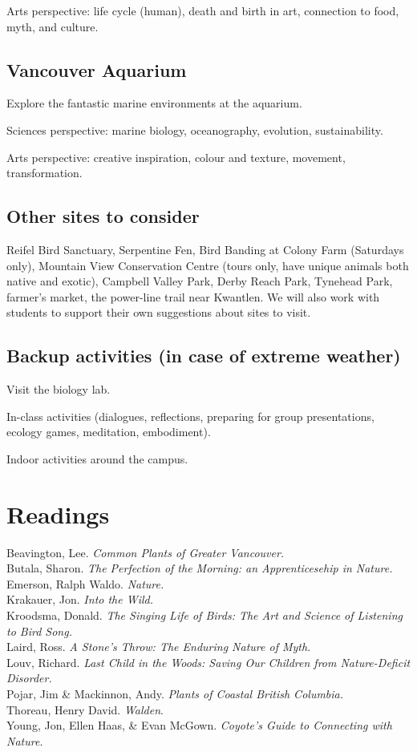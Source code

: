 \documentclass[12pt, letterpaper]{article}
\begin{document}
Arts perspective: life cycle (human), death and birth in art, connection to food, myth, and culture.

\subsection{Vancouver Aquarium}

Explore the fantastic marine environments at the aquarium.

Sciences perspective: marine biology, oceanography, evolution, sustainability.

Arts perspective: creative inspiration, colour and texture, movement, transformation.

\subsection{Other sites to consider}

Reifel Bird Sanctuary, Serpentine Fen, Bird
Banding at Colony Farm (Saturdays only), Mountain View Conservation
Centre (tours only, have unique animals both native and exotic),
Campbell Valley Park, Derby Reach Park, Tynehead Park, farmer's market,
the power-line trail near Kwantlen. We will also work with students to support their own suggestions about sites to visit.

\subsection{Backup activities (in case of extreme weather)}

Visit the biology lab.

In-class activities (dialogues, reflections, preparing for group presentations, ecology games, meditation, embodiment).

Indoor activities around the campus.

\section{Readings}

Beavington, Lee. \emph{Common Plants of Greater Vancouver.}\\
Butala, Sharon. \emph{The Perfection of the Morning: an Apprenticesehip in
Nature.}\\
 Emerson, Ralph Waldo. \emph{Nature.}\\ Krakauer, Jon. \emph{Into
the Wild.}\\ Kroodsma, Donald. \emph{The Singing Life of Birds: The Art
and Science of Listening to Bird Song.}\\ Laird, Ross. \emph{A Stone's
Throw: The Enduring Nature of Myth.}\\ Louv, Richard. \emph{Last Child in
the Woods: Saving Our Children from Nature-Deficit Disorder.}\\ Pojar, Jim
\& Mackinnon, Andy. \emph{Plants of Coastal British Columbia.}\\ Thoreau,
Henry David. \emph{Walden}.\\ Young, Jon, Ellen Haas, \& Evan McGown.
\emph{Coyote's Guide to Connecting with Nature.}
\end{document}
